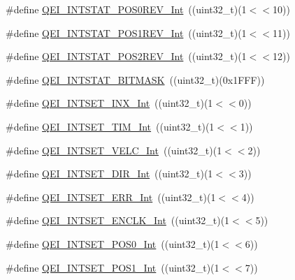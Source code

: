 \begin{DoxyCompactItemize}
\item 
\#define \hyperlink{group___q_e_i___private___macros_ga781169ca017eb10d8aa51f36923242b8}{\-Q\-E\-I\-\_\-\-I\-N\-T\-S\-T\-A\-T\-\_\-\-P\-O\-S0\-R\-E\-V\-\_\-\-Int}~((uint32\-\_\-t)(1$<$$<$10))
\item 
\#define \hyperlink{group___q_e_i___private___macros_ga87a799a0288cebf5fb1d19d086b55847}{\-Q\-E\-I\-\_\-\-I\-N\-T\-S\-T\-A\-T\-\_\-\-P\-O\-S1\-R\-E\-V\-\_\-\-Int}~((uint32\-\_\-t)(1$<$$<$11))
\item 
\#define \hyperlink{group___q_e_i___private___macros_ga6553c523406e9e9c304b221aa626971d}{\-Q\-E\-I\-\_\-\-I\-N\-T\-S\-T\-A\-T\-\_\-\-P\-O\-S2\-R\-E\-V\-\_\-\-Int}~((uint32\-\_\-t)(1$<$$<$12))
\item 
\#define \hyperlink{group___q_e_i___private___macros_gabb60cd0187cbf49a7d5ad6d03ffe0914}{\-Q\-E\-I\-\_\-\-I\-N\-T\-S\-T\-A\-T\-\_\-\-B\-I\-T\-M\-A\-S\-K}~((uint32\-\_\-t)(0x1\-F\-F\-F))
\item 
\#define \hyperlink{group___q_e_i___private___macros_ga3a9010f19b5eb6864df6f27686194ffd}{\-Q\-E\-I\-\_\-\-I\-N\-T\-S\-E\-T\-\_\-\-I\-N\-X\-\_\-\-Int}~((uint32\-\_\-t)(1$<$$<$0))
\item 
\#define \hyperlink{group___q_e_i___private___macros_ga06221a1884d6ec83167d29123b365001}{\-Q\-E\-I\-\_\-\-I\-N\-T\-S\-E\-T\-\_\-\-T\-I\-M\-\_\-\-Int}~((uint32\-\_\-t)(1$<$$<$1))
\item 
\#define \hyperlink{group___q_e_i___private___macros_ga8602f95e032dc1e0fd639cf4e6a9efd3}{\-Q\-E\-I\-\_\-\-I\-N\-T\-S\-E\-T\-\_\-\-V\-E\-L\-C\-\_\-\-Int}~((uint32\-\_\-t)(1$<$$<$2))
\item 
\#define \hyperlink{group___q_e_i___private___macros_ga11aa7e43cb9a1c77c9164ebb45ca449d}{\-Q\-E\-I\-\_\-\-I\-N\-T\-S\-E\-T\-\_\-\-D\-I\-R\-\_\-\-Int}~((uint32\-\_\-t)(1$<$$<$3))
\item 
\#define \hyperlink{group___q_e_i___private___macros_gad6de145b6933e8ae9e09f6228fe0eb29}{\-Q\-E\-I\-\_\-\-I\-N\-T\-S\-E\-T\-\_\-\-E\-R\-R\-\_\-\-Int}~((uint32\-\_\-t)(1$<$$<$4))
\item 
\#define \hyperlink{group___q_e_i___private___macros_ga1068c7845806056ae167fd4b6becb93f}{\-Q\-E\-I\-\_\-\-I\-N\-T\-S\-E\-T\-\_\-\-E\-N\-C\-L\-K\-\_\-\-Int}~((uint32\-\_\-t)(1$<$$<$5))
\item 
\#define \hyperlink{group___q_e_i___private___macros_ga624b7728ca0b6138f0de1a90f4effca9}{\-Q\-E\-I\-\_\-\-I\-N\-T\-S\-E\-T\-\_\-\-P\-O\-S0\-\_\-\-Int}~((uint32\-\_\-t)(1$<$$<$6))
\item 
\#define \hyperlink{group___q_e_i___private___macros_ga3ac428cd84ab282183985b857dcefdfb}{\-Q\-E\-I\-\_\-\-I\-N\-T\-S\-E\-T\-\_\-\-P\-O\-S1\-\_\-\-Int}~((uint32\-\_\-t)(1$<$$<$7))
$$
\end{DoxyCompactItemize}
